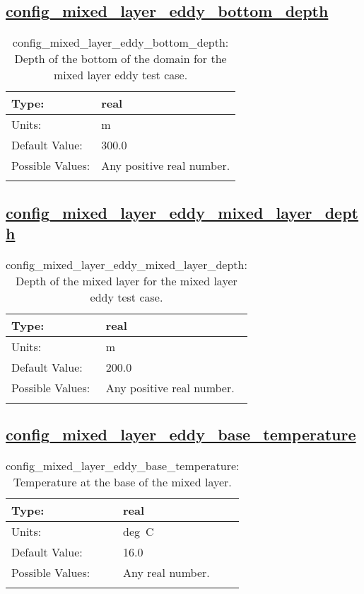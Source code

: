 \subsection[config\_mixed\_layer\_eddy\_bottom\_depth]{\hyperref[sec:nm_tab_mixed_layer_eddy]{config\_mixed\_layer\_eddy\_bottom\_depth}}
\label{subsec:nm_sec_config_mixed_layer_eddy_bottom_depth}
\begin{center}
\begin{longtable}{| p{2.0in} || p{4.0in} |}
    \hline
    Type: & real \\
    \hline
    Units: & \si{m} \\
    \hline
    Default Value: & 300.0 \\
    \hline
    Possible Values: & Any positive real number. \\
    \hline
    \caption{config\_mixed\_layer\_eddy\_bottom\_depth: Depth of the bottom of the domain for the mixed layer eddy test case.}
\end{longtable}
\end{center}
\subsection[config\_mixed\_layer\_eddy\_mixed\_layer\_depth]{\hyperref[sec:nm_tab_mixed_layer_eddy]{config\_mixed\_layer\_eddy\_mixed\_layer\_depth}}
\label{subsec:nm_sec_config_mixed_layer_eddy_mixed_layer_depth}
\begin{center}
\begin{longtable}{| p{2.0in} || p{4.0in} |}
    \hline
    Type: & real \\
    \hline
    Units: & \si{m} \\
    \hline
    Default Value: & 200.0 \\
    \hline
    Possible Values: & Any positive real number. \\
    \hline
    \caption{config\_mixed\_layer\_eddy\_mixed\_layer\_depth: Depth of the mixed layer for the mixed layer eddy test case.}
\end{longtable}
\end{center}
\subsection[config\_mixed\_layer\_eddy\_base\_temperature]{\hyperref[sec:nm_tab_mixed_layer_eddy]{config\_mixed\_layer\_eddy\_base\_temperature}}
\label{subsec:nm_sec_config_mixed_layer_eddy_base_temperature}
\begin{center}
\begin{longtable}{| p{2.0in} || p{4.0in} |}
    \hline
    Type: & real \\
    \hline
    Units: & \si{deg.C} \\
    \hline
    Default Value: & 16.0 \\
    \hline
    Possible Values: & Any real number. \\
    \hline
    \caption{config\_mixed\_layer\_eddy\_base\_temperature: Temperature at the base of the mixed layer.}
\end{longtable}
\end{center}
